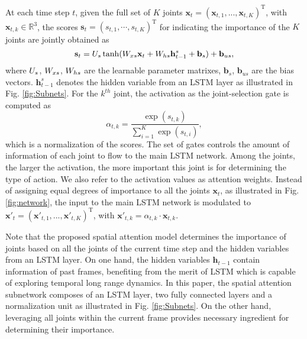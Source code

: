 \documentclass[letterpaper]{article}
\begin{document}
At each time step $t$, given the full set of $K$ joints $\mathbf{x}_t = \left( \mathbf{x}_{t,1}, ..., \mathbf{x}_{t,K} \right)^\mathrm{T}$, with $\mathbf{x}_{t,k}\in \mathbb{R}^{3}$, the scores $\mathbf{s}_t=(s_{t,1}, \cdots, s_{t,K})^\mathrm{T}$ for indicating the importance of the $K$ joints are jointly obtained as
\begin{equation}
\label{equ:spa_att_2}
\mathbf{s}_t = {U}_{s} \tanh({W}_{xs}\mathbf{x}_t + {W}_{hs}\mathbf{h}_{t-1}^{s} + \mathbf{b}_{s}) + \mathbf{b}_{us},
\end{equation}
where ${U}_s$, ${W}_{xs}$, ${W}_{hs}$ are the learnable parameter matrixes, $\mathbf{b}_{s}$, $\mathbf{b}_{us}$ are the bias vectors. $\mathbf{h}_{t-1}^{s}$ denotes the hidden variable from an LSTM layer as illustrated in Fig. \ref{fig:Subnets}. For the $k^{th}$ joint, the activation as the joint-selection gate is computed as
\begin{equation}
\label{equ:spa_att_1}
\alpha_{t,k} = \frac{\exp(s_{t,k})}{\sum_{i=1} ^ K \exp(s_{t,i})},
\end{equation}
which is a normalization of the scores. The set of gates controls the amount of information of each joint to flow to the main LSTM network. Among the joints, the larger the activation, the more important this joint is for determining the type of action. We also refer to the activation values as attention weights. Instead of assigning equal degrees of importance to all the joints $\mathbf{x}_t$, as illustrated in Fig. \ref{fig:network}, the input to the main LSTM network is modulated to $\mathbf{x'}_t = \left( \mathbf{x'}_{t,1}, ..., \mathbf{x'}_{t,K} \right)^\mathrm{T}$, with $\mathbf{x'}_{t,k} = \alpha_{t,k} \cdot \mathbf{x}_{t,k}$.
\begin{comment}
\begin{equation}
\label{equ:spa_att_con}
\mathbf{x'}_{t,k} = \alpha_{t,k} \cdot \mathbf{x}_{t,k}.
\end{equation}
\end{comment}

Note that the proposed spatial attention model determines the importance of joints based on all the joints of the current time step and the hidden variables from an LSTM layer. On one hand, the hidden variables $\mathbf{h}_{t-1}$ contain information of past frames, benefiting from the merit of LSTM which is capable of exploring temporal long range dynamics. In this paper, the spatial attention subnetwork composes of an LSTM layer, two fully connected layers and a normalization unit as illustrated in Fig. \ref{fig:Subnets}. On the other hand, leveraging all joints within the current frame provides necessary ingredient for determining their importance.
\end{document}
